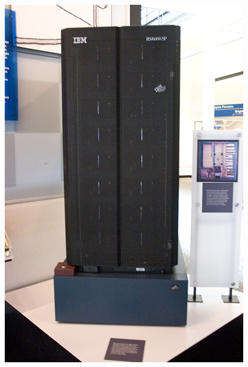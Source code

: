 \documentclass[12pt, aspectratio=169]{beamer}
\begin{document}
\begin{frame}
\begin{columns}[c]
\begin{figure}
  \includegraphics[width=0.9\linewidth]{Deep_Blue.jpg}
\end{figure}
\end{columns}
\end{frame}
\end{document}
